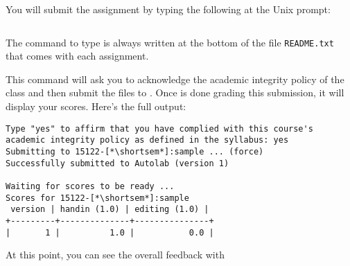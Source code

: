 \begin{part}
You will submit the assignment by typing the following
at the Unix prompt:
\begin{lstlisting}[language={[coin]C}]
% autolab122 handin sample factorial.c0 favorite_number.c0
\end{lstlisting}\vspace{-1.5ex}
The command to type is always written at the bottom of the file
\lstinline'README.txt' that comes with each assignment.

This command will ask you to acknowledge the academic integrity policy
of the class and then submit the files to \autolab{}.  Once \autolab{}
is done grading this submission, it will display your scores.  Here's
the full output:
\begin{lstlisting}[language={[coin]C}, deletekeywords={for},
  deletedelim={[l]{Type\ }}, deletestring={[b]{'}}]
% autolab122 handin sample factorial.c0 favorite_number.c0
Type "yes" to affirm that you have complied with this course's
academic integrity policy as defined in the syllabus: yes
Submitting to 15122-[*\shortsem*]:sample ... (force)
Successfully submitted to Autolab (version 1)

Waiting for scores to be ready ...
Scores for 15122-[*\shortsem*]:sample
 version | handin (1.0) | editing (1.0) |
+---------+--------------+---------------+
|       1 |          1.0 |           0.0 |
\end{lstlisting}

At this point, you can see the overall \autolab{} feedback with
\begin{lstlisting}[language={[coin]C}]
% autolab122 feedback
\end{lstlisting}
\chkptB
\end{part}
